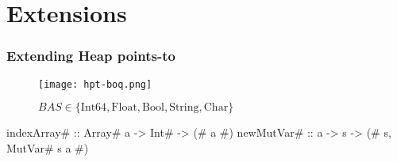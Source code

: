 \documentclass[bigger]{beamer}
\begin{document}
\section{Extensions}

\begin{frame}[fragile]
\frametitle{Extending Heap points-to}

	\vspace{1cm}
	\begin{minipage}{\textwidth}
		\begin{figure}
			\texttt{[image: hpt-boq.png]}
		\end{figure}
	\end{minipage}
	\vfill
	\pause
	\begin{minipage}{\textwidth}
		\begin{figure}
			$BAS \in \{ \text{Int64}, \text{Float}, \text{Bool}, \text{String}, \text{Char} \}$
		\end{figure}
	\end{minipage}
	\vfill
	\pause
	\begin{center}
		\begin{minipage}{0.8\textwidth}
			\begin{haskellcode}
				indexArray# :: Array# a -> Int# -> (# a #)
				newMutVar#  :: a -> s -> (# s, MutVar# s a #)
			\end{haskellcode}
		\end{minipage}
	\end{center}

\end{frame}
\end{document}
